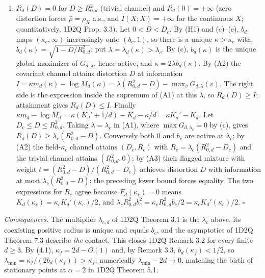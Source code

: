 \documentclass[
  11pt,
  a4paper,
]{article}
\begin{document}
\begin{enumerate}
  (1D2Q (112)). Insert the active sets from (c).
\item
  \(R_d(D)=0\) for \(D\ge R_{0,\allowbreak{}d}^2\) (trivial channel) and
  \(R_d(0)=+\infty\) (zero distortion forces \(\hat\rho=\rho_X\) a.s.,
  and \(I(X;\allowbreak{}X)=+\infty\) for the continuous \(X\); quantitatively, 1D2Q
  Prop. 3.3). Let \(0<D<D_c\). By (H1) and (c)--(e), \(b_d\) maps
  \((\kappa_c,\allowbreak{}\infty)\) increasingly onto \((b_c,\allowbreak{}1)\), so there is a
  unique \(\kappa>\kappa_c\) with \(b_d(\kappa)=\sqrt{1-D/R_{0,\allowbreak{}d}^2}\);
  put \(\lambda=\lambda_d(\kappa)>\lambda_c\). By (c), \(b_d(\kappa)\)
  is the unique global maximizer of \(G_{d,\allowbreak{}\lambda}\), hence active, and
  \(\kappa=2\lambda b_d(\kappa)\). By (A2) the covariant channel attains
  distortion \(D\) at information
  \(I=\kappa m_d(\kappa)-\log M_d(\kappa)=\lambda(R_{0,\allowbreak{}d}^2-D)-\max_vG_{d,\allowbreak{}\lambda}(v)\).
  The right side is the expression inside the supremum of (A1) at this
  \(\lambda\), so \(R_d(D)\ge I\); attainment gives \(R_d(D)\le I\).
  Finally
  \(\kappa m_d-\log M_d=\kappa(K_d'+1/d)-K_d-\kappa/d=\kappa K_d'-K_d\).
  Let \(D_c\le D\le R_{0,\allowbreak{}d}^2\). Taking \(\lambda=\lambda_c\) in (A1),
  where \(\max G_{d,\allowbreak{}\lambda_c}=0\) by (c), gives
  \(R_d(D)\ge\lambda_c(R_{0,\allowbreak{}d}^2-D)\). Conversely both \(0\) and \(b_c\)
  are active at \(\lambda_c\); by (A2) the field-\(\kappa_c\) channel
  attains \((D_c,\allowbreak{}R_c)\) with \(R_c=\lambda_c(R_{0,\allowbreak{}d}^2-D_c)\) and the
  trivial channel attains \((R_{0,\allowbreak{}d}^2,\allowbreak{}0)\); by (A3) their flagged
  mixture with weight \(t=(R_{0,\allowbreak{}d}^2-D)/(R_{0,\allowbreak{}d}^2-D_c)\) achieves
  distortion \(D\) with information at most \(\lambda_c(R_{0,\allowbreak{}d}^2-D)\);
  the preceding lower bound forces equality. The two expressions for
  \(R_c\) agree because \(F_d(\kappa_c)=0\) means
  \(K_d(\kappa_c)=\kappa_cK_d'(\kappa_c)/2\), and
  \(\lambda_cR_{0,\allowbreak{}d}^2b_c^2=\kappa_cR_{0,\allowbreak{}d}^2b_c/2=\kappa_cK_d'(\kappa_c)/2\).
  \(\square\)
\end{enumerate}

\emph{Consequences.} The multiplier \(\lambda_{c,\allowbreak{}d}\) of 1D2Q Theorem
3.1 is the \(\lambda_c\) above, its coexisting positive radius is unique
and equals \(b_c\), and the asymptotics of 1D2Q Theorem 7.3 describe
\emph{the} contact. This closes 1D2Q Remark 3.2 for every finite
\(d\ge3\). By (4.1), \(\kappa_f=2d-O(1)\) and, by Remark 3.3,
\(b_d(\kappa_f)<1/2\), so
\(\lambda_{\min}=\kappa_f/(2b_d(\kappa_f))>\kappa_f\); numerically
\(\lambda_{\min}-2d\to0\), matching the birth of stationary points at
\(\alpha=2\) in 1D2Q Theorem 5.1.
\end{document}
